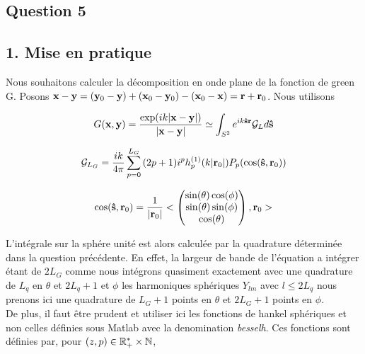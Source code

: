 \documentclass[10pt]{article}
\begin{document}
\begin{multicols}{2}










\section*{Question 5}

\subsection*{1. Mise en pratique}

Nous souhaitons calculer la décomposition en onde plane de la fonction de green G. Posons ${\bf x} - {\bf y} = ({\bf y}_0 - {\bf y}) + ({\bf x}_0 - {\bf y}_0) - ({\bf x}_0 - {\bf x}) = {\bf r} + {\bf r}_0$. Nous utilisons

\begin{equation}
	G({\bf x}, {\bf y}) = \frac{\exp(ik|{\bf x}-{\bf y}|)}{|{\bf x}-{\bf y}|} \simeq \int_{S^{2}}{e^{ik{\bf \hat{s}}{\bf r}}\mathcal{G}_Ld{\bf \hat{s}}}
\end{equation}

\vspace*{-11pt}

\begin{equation}
\mathcal{G}_{L_G} = \frac{ik}{4\pi}\sum_{p=0}^{L_G}{(2p+1)i^{p}h_p^{(1)}(k|{\bf r}_0|)P_p(\cos({\bf \hat{s}}, {\bf r}_0))}
\end{equation}

\vspace*{-11pt}

\begin{equation}
\cos({\bf \hat{s}}, {\bf r}_0) = \frac{1}{|{\bf r}_0|}< \begin{pmatrix} \sin(\theta)\cos(\phi)  \\ \sin(\theta)\sin(\phi)  \\ \cos(\theta) \end{pmatrix} , {\bf r}_0 >
\end{equation}


L'intégrale sur la sphére unité est alors calculée par la quadrature déterminée dans la question précédente. En effet, la largeur de bande de l'équation a intégrer étant de $2L_G$ comme nous intégrons quasiment exactement avec une quadrature de $L_q$ en $\theta$ et $2L_q+1$ et $\phi$ les harmoniques sphériques $Y_{lm}$ avec $l \le 2L_q$ nous prenons ici une quadrature de $L_G+1$ points en $\theta$ et $2L_G+1$ points en $\phi$. \\
\indent
De plus, il faut être prudent et utiliser ici les fonctions de hankel sphériques et non celles définies sous Matlab avec la denomination \textit{besselh}. Ces fonctions sont définies par, pour $(z,p) \in \mathbb{R}^{*}_{+}\times\mathbb{N}$,


\end{multicols}
\end{document}
